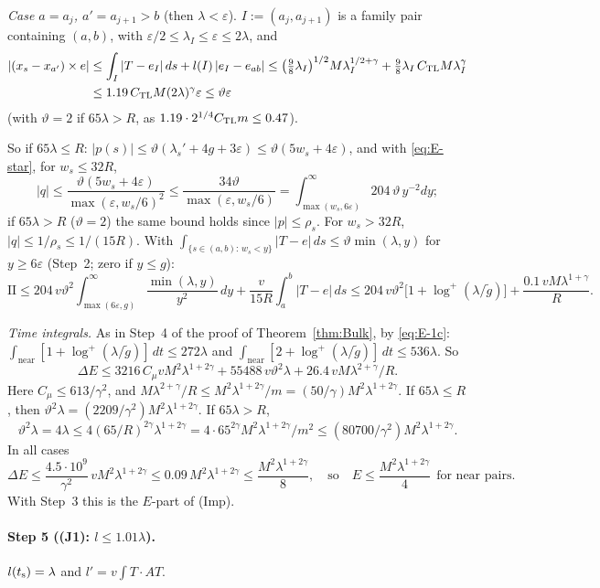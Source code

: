 \emph{Case $a=a_j$, $a'=a_{j+1}>b$} (then $\lambda<\varepsilon$). $I:=(a_j,a_{j+1})$ is a family pair containing $(a,b)$, with
$\varepsilon/2\le\lambda_I\le\varepsilon\le2\lambda$, and
\[
\begin{aligned}
|(x_s-x_{a'})\times e|&\le\int_I|T-e_I|\,ds+l(I)\,|e_I-e_{ab}|
\le\bigl(\tfrac98\lambda_I\bigr)^{1/2}M\lambda_I^{1/2+\gamma}+\tfrac98\lambda_I\,C_{\mathrm{TL}} M\lambda_I^\gamma\\
&\le1.19\,C_{\mathrm{TL}} M(2\lambda)^\gamma\varepsilon\le\vartheta\varepsilon
\end{aligned}
\]
(with $\vartheta=2$ if $65\lambda>R$, as $1.19\cdot2^{1/4}C_{\mathrm{TL}} m\le0.47$).

So if $65\lambda\le R$: $|p(s)|\le\vartheta(\lambda_s'+4g+3\varepsilon)\le\vartheta(5w_s+4\varepsilon)$, and with
\eqref{eq:E-star}, for $w_s\le32R$,
\[
|q|\le\frac{\vartheta(5w_s+4\varepsilon)}{\max(\varepsilon,w_s/6)^2}\le\frac{34\vartheta}{\max(\varepsilon,w_s/6)}
=\int_{\max(w_s,6\varepsilon)}^\infty204\,\vartheta\,y^{-2}dy ;
\]
if $65\lambda>R$ ($\vartheta=2$) the same bound holds since $|p|\le\rho_s$. For $w_s>32R$, $|q|\le1/\rho_s\le1/(15R)$. With
$\int_{\{s\in(a,b):\,w_s<y\}}|T-e|\,ds\le\vartheta\min(\lambda,y)$ for $y\ge6\varepsilon$ (Step~2; zero if $y\le g$):
\[
\mathrm{II}\le204\,v\vartheta^2\int_{\max(6\varepsilon,g)}^\infty\frac{\min(\lambda,y)}{y^2}\,dy+\frac v{15R}\int_a^b|T-e|\,ds
\le204\,v\vartheta^2\bigl[1+\log^+(\lambda/\tilde g)\bigr]+\frac{0.1\,vM\lambda^{1+\gamma}}R .
\]

\emph{Time integrals.} As in Step~4 of the proof of Theorem~\ref{thm:Bulk}, by \eqref{eq:E-1c}:
$\int_{\mathrm{near}}[1+\log^+(\lambda/\tilde g)]\,dt\le272\lambda$ and $\int_{\mathrm{near}}[2+\log^+(\lambda/\tilde g)]\,dt\le536\lambda$.
So
\[
\Delta E\le3216\,C_\mu vM^2\lambda^{1+2\gamma}+55488\,v\vartheta^2\lambda+26.4\,vM\lambda^{2+\gamma}/R .
\]
Here $C_\mu\le613/\gamma^2$, and $M\lambda^{2+\gamma}/R\le M^2\lambda^{1+2\gamma}/m=(50/\gamma)M^2\lambda^{1+2\gamma}$. If
$65\lambda\le R$, then $\vartheta^2\lambda=(2209/\gamma^2)M^2\lambda^{1+2\gamma}$. If $65\lambda>R$,
\[
\vartheta^2\lambda=4\lambda\le4(65/R)^{2\gamma}\lambda^{1+2\gamma}=4\cdot65^{2\gamma}M^2\lambda^{1+2\gamma}/m^2
\le(80700/\gamma^2)M^2\lambda^{1+2\gamma}.
\]
In all cases
\[
\Delta E\le\frac{4.5\cdot10^9}{\gamma^2}\,vM^2\lambda^{1+2\gamma}\le0.09\,M^2\lambda^{1+2\gamma}\le\frac{M^2\lambda^{1+2\gamma}}8,
\quad\text{so}\quad E\le\frac{M^2\lambda^{1+2\gamma}}4\ \ \text{for near pairs.}
\]
With Step~3 this is the $E$-part of (Imp).

\paragraph{Step 5 ((J1): $l\le1.01\lambda$).}
$l(t_{\mathrm s})=\lambda$ and $l'=v\int T\cdot AT$.

